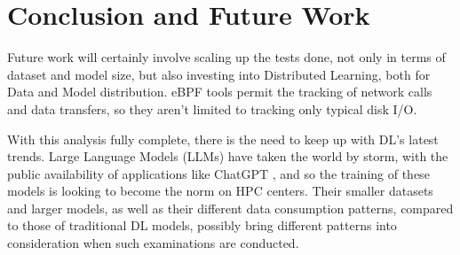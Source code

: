 \documentclass[conference]{IEEEtran}
\begin{document}


\section{Conclusion and Future Work}

Future work will certainly involve scaling up the tests done, not only in terms of dataset and model size, but also investing into Distributed Learning, both for Data and Model distribution. eBPF tools permit the tracking of network calls and data transfers, so they aren't limited to tracking only typical disk I/O.

With this analysis fully complete, there is the need to keep up with DL's latest trends. Large Language Models (LLMs) have taken the world by storm, with the public availability of applications like ChatGPT \cite{chatgpt}, and so the training of these models is looking to become the norm on HPC centers. Their smaller datasets and larger models, as well as their different data consumption patterns, compared to those of traditional DL models, possibly bring different patterns into consideration when such examinations are conducted. 


\end{document}
